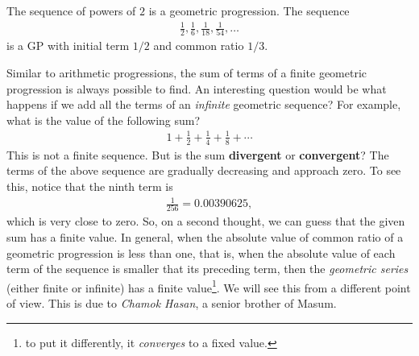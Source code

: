 \documentclass{subfile}
\begin{document}
	\begin{example}
		The sequence of powers of $2$ is a geometric progression. The sequence
			\begin{align*}
				\frac{1}{2}, \frac{1}{6}, \frac{1}{18}, \frac{1}{54}, \dots
			\end{align*}
		is a GP with initial term $1/2$ and common ratio $1/3$.
	\end{example}
	
	Similar to arithmetic progressions, the sum of terms of a finite geometric progression is always possible to find. An interesting question would be what happens if we add all the terms of an \textit{infinite} geometric sequence? For example, what is the value of the following sum?
		\begin{align*}
			1 + \frac{1}{2}+ \frac{1}{4}+\frac{1}{8}+ \cdots
		\end{align*}
	This is not a finite sequence. But is the sum \textbf{divergent} or \textbf{convergent}? The terms of the above sequence are gradually decreasing and approach zero. To see this, notice that the ninth term is
		\begin{align*}
			\frac{1}{256} = 0.00390625,
		\end{align*}
	which is very close to zero. So, on a second thought, we can guess that the given sum has a finite value. In general, when the absolute value of common ratio of a geometric progression is less than one, that is, when the absolute value of each term of the sequence is smaller that its preceding term, then the \textit{geometric series} (either finite or infinite) has a finite value\footnote{to put it differently, it \textit{converges} to a fixed value.}. We will see this from a different point of view. This is due to \textit{Chamok Hasan}, a senior brother of Masum.
	
\end{document}

